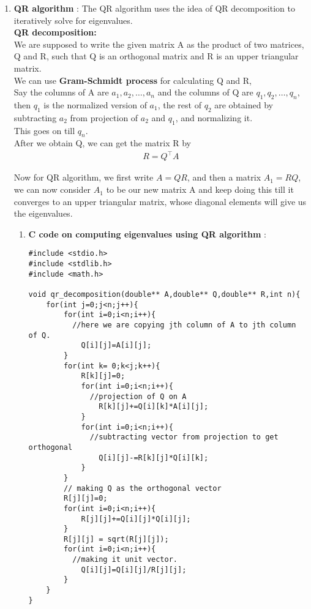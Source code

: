\documentclass[journal]{IEEEtran}
\begin{document}
\begin{enumerate}
    \item \textbf{QR algorithm} : The QR algorithm uses the idea of QR decomposition to iteratively solve for eigenvalues.\\
    
    \textbf{QR decomposition:}\\
    We are supposed to write the given matrix A as the product of two matrices, Q and R, such that Q is an orthogonal matrix and R is an upper triangular matrix.\\
    We can use \textbf{Gram-Schmidt process} for calculating Q and R, \\
    Say the columns of A are $a_1,a_2,\dots, a_n$ and the columns of Q are $q_1,q_2,\dots,q_n$, \\
    then $q_1$ is the normalized version of $a_1$, the rest of $q_2$ are obtained by subtracting $a_2$ from projection of $a_2$ and $q_1$, and normalizing it. \\This goes on till $q_n$.\\
    After we obtain Q, we can get the matrix R by \\
    \begin{align}
        R=Q^\top A
    \end{align}
    
    Now for QR algorithm, we first write $A=QR$, and then a matrix $A_1=RQ$, we can now consider $A_1$ to be our new matrix A and keep doing this till it converges to an upper triangular matrix, whose diagonal elements will give us the eigenvalues.\\
    
    \begin{enumerate}
        \item \textbf{C code on computing eigenvalues using QR algorithm} :
        \begin{lstlisting}
#include <stdio.h>
#include <stdlib.h>
#include <math.h>

void qr_decomposition(double** A,double** Q,double** R,int n){
    for(int j=0;j<n;j++){
        for(int i=0;i<n;i++){
          //here we are copying jth column of A to jth column of Q.
            Q[i][j]=A[i][j];
        }
        for(int k= 0;k<j;k++){
            R[k][j]=0;
            for(int i=0;i<n;i++){
              //projection of Q on A
                R[k][j]+=Q[i][k]*A[i][j];
            }
            for(int i=0;i<n;i++){
              //subtracting vector from projection to get orthogonal
                Q[i][j]-=R[k][j]*Q[i][k];
            }
        }
        // making Q as the orthogonal vector
        R[j][j]=0;
        for(int i=0;i<n;i++){
            R[j][j]+=Q[i][j]*Q[i][j];
        }
        R[j][j] = sqrt(R[j][j]);
        for(int i=0;i<n;i++){
          //making it unit vector.
            Q[i][j]=Q[i][j]/R[j][j];
        }
    }
}


\end{lstlisting}
\end{enumerate}
\end{enumerate}
\end{document}

